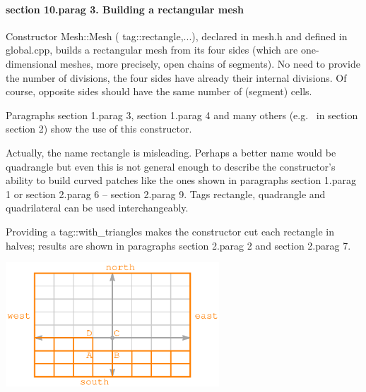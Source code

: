 \paragraph{\numb section 10.\numb parag 3. Building a rectangular mesh}

Constructor {\codett Mesh::Mesh ( tag::rectangle,...)}, declared in {\codett mesh.h} and defined in
{\codett global.cpp}, builds a rectangular mesh from its
four sides (which are one-dimensional meshes, more precisely, open chains of segments).
No need to provide the number of divisions, the four sides have already their internal divisions.
Of course, opposite sides should have the same number of (segment) cells.

Paragraphs \numb section 1.\numb parag 3, \numb section 1.\numb parag 4 and many others (e.g.%
\ in section \numb section 2) show the use of this constructor.

Actually, the name {\codett rectangle} is misleading.
Perhaps a better name would be {\codett quadrangle} but even this is not general enough to
describe the constructor's ability to build curved patches like the ones shown in paragraphs
\numb section 1.\numb parag 1 or \numb section 2.\numb parag 6 -- \numb section 2.\numb parag 9.
Tags {\codett rectangle}, {\codett quadrangle} and {\codett quadrilateral} can be used
interchangeably.

Providing a {\codett tag::with\_triangles} makes the constructor cut each rectangle in halves;
results are shown in paragraphs \numb section 2.\numb parag 2 and \numb section 2.\numb parag 7.

{ 
\centerline{\includegraphics[width=80mm]{fig-rectangle.eps}} }

